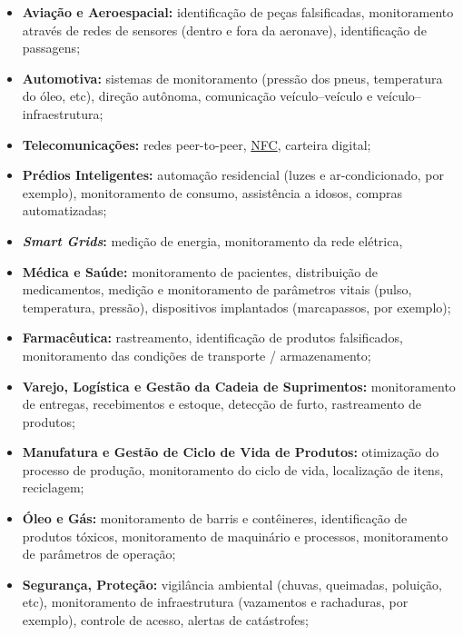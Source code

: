 \documentclass[twoside,english,brazilian]{UNISINOSmonografia}
\begin{document}
\begin{itemize}
	
	\item \textbf{Aviação e Aeroespacial:}
identificação de peças falsificadas, monitoramento através de redes de 
sensores (dentro e fora da aeronave), identificação de passagens;
	
	\item \textbf{Automotiva:}
sistemas de monitoramento (pressão dos pneus, temperatura do óleo, etc), 
direção autônoma, comunicação veículo--veículo e veículo--infraestrutura;
	
	\item \textbf{Telecomunicações:}
redes peer-to-peer, \hyperref[siglas]{NFC}, carteira digital;
	
	\item \textbf{Prédios Inteligentes:}
automação residencial (luzes e ar-condicionado, por exemplo), monitoramento de 
consumo, assistência a idosos, compras automatizadas;
	
	\item \textbf{\textit{Smart Grids}:}
medição de energia, monitoramento da rede elétrica,  
	
	\item \textbf{Médica e Saúde:}
monitoramento de pacientes, distribuição de medicamentos, medição e 
monitoramento de parâmetros vitais (pulso, temperatura, pressão), dispositivos 
implantados (marcapassos, por exemplo);
	
	\item \textbf{Farmacêutica:}
rastreamento, identificação de produtos falsificados, monitoramento das 
condições de transporte / armazenamento;
	
	\item \textbf{Varejo, Logística e Gestão da Cadeia de Suprimentos:}
monitoramento de entregas, recebimentos e estoque, detecção de furto, 
rastreamento de produtos;
	
	\item \textbf{Manufatura e Gestão de Ciclo de Vida de Produtos:}
otimização do processo de produção, monitoramento do ciclo de vida, 
localização de itens, reciclagem;
	
	\item \textbf{Óleo e Gás:}
monitoramento de barris e contêineres, identificação de produtos tóxicos, 
monitoramento de maquinário e processos, monitoramento de parâmetros de 
operação;
	
	\item \textbf{Segurança, Proteção:}
vigilância ambiental (chuvas, queimadas, poluição, etc), monitoramento de 
infraestrutura (vazamentos e rachaduras, por exemplo), controle de acesso, 
alertas de catástrofes;
	

\end{itemize}
\end{document}
